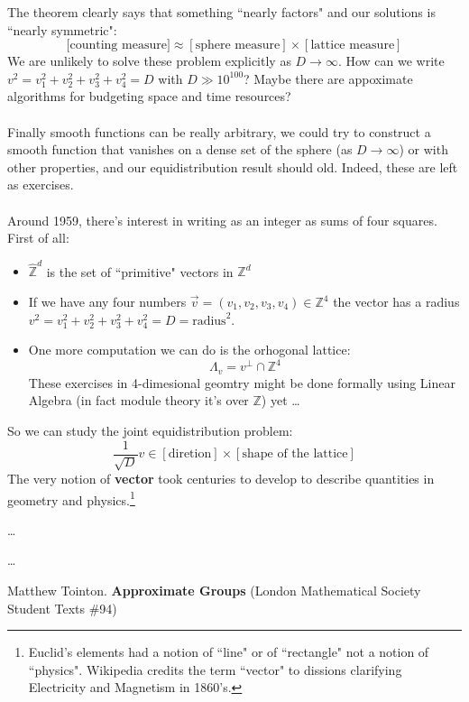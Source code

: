 \documentclass[12pt]{article}
\begin{document}
{The theorem clearly says that something ``nearly factors" and our solutions is ``nearly symmetric":
$$[\text{counting measure]} \approx [\text{sphere measure}] \times [\text{lattice measure}] $$
We are unlikely to solve these problem explicitly as $D \to \infty$.  How can we write $v^2 = v_1^2 + v_2^2 + v_3^2 + v_4^2 = D$ with $D \gg 10^{100}$?  Maybe there are appoximate algorithms for budgeting space and time resources? \\ \\
Finally smooth functions can be really arbitrary, we could try to construct a smooth function that vanishes on a dense set of the sphere (as $D \to \infty$) or with other properties, and our equidistribution result should old.  Indeed, these are left as exercises. \\ \\
Around 1959, there's interest in writing as an integer as sums of four squares.  First of all:
\begin{itemize}
\item $\widehat{\mathbb{Z}}^d$ is the set of ``primitive" vectors in $\mathbb{Z}^d$
\item If we have any four numbers $\vec{v} = (v_1, v_2, v_3, v_4) \in \mathbb{Z}^4 $ the vector has a radius $v^2 = v_1^2 + v_2^2 + v_3^2 + v_4^2 = D = \text{radius}^2$.
\item One more computation we can do is the orhogonal lattice: $$\Lambda_v =v^\perp \cap \mathbb{Z}^4 $$
These exercises in 4-dimesional geomtry might be done formally using Linear Algebra (in fact module theory it's over $\mathbb{Z}$) yet \dots 
\end{itemize}
So we can study the joint equidistribution problem:
$$ \frac{1}{\sqrt{D}} v \in  [\text{diretion}] \times [\text{shape of the lattice}] $$
The very notion of \textbf{vector} took centuries to develop to describe quantities in geometry and physics.\footnote{Euclid's elements had a notion of ``line" or of ``rectangle" not a notion of ``physics".  Wikipedia credits the term ``vector" to dissions clarifying Electricity and Magnetism in 1860's.}
\vfill

\begin{thebibliography}{}

\item \dots
\item \dots 
\item \item Matthew Tointon.  \textbf{Approximate Groups} (London Mathematical Society Student Texts \#94)



\end{thebibliography}}
\end{document}
